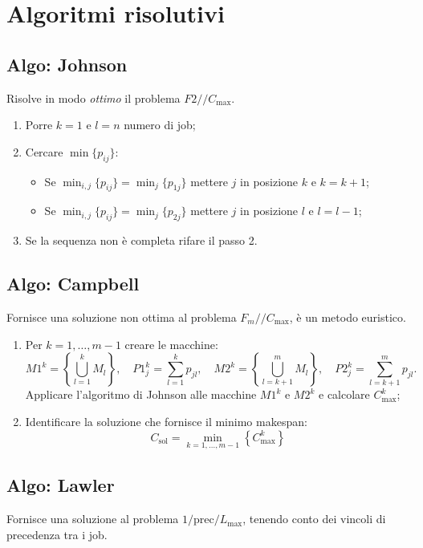 %
\section{Algoritmi risolutivi}
%
\subsection{Algo: Johnson}
Risolve in modo \emph{ottimo} il problema $ F2 / / C_{\max} $.
\begin{enumerate}[leftmargin=2.1cm, label=Passo \arabic*.]
    \item Porre $ k=1 $ e $ l=n $ numero di job;
    \item Cercare $ \min\{ p_{ij} \} $:
          \begin{itemize}
              \item Se $ \min_{i,j} \{ p_{ij} \} = \min_{j} \{ p_{1j} \}$ mettere $ j $ in posizione $ k $ e $ k=k+1 $;
              \item Se $ \min_{i,j} \{ p_{ij} \} = \min_{j} \{ p_{2j} \}$ mettere $ j $ in posizione $ l $ e $ l=l-1 $;
          \end{itemize}
    \item Se la sequenza non è completa rifare il passo 2.
\end{enumerate}

%
\subsection{Algo: Campbell}
Fornisce una soluzione non ottima al problema $ F_{m} / / C_{\max} $, è un metodo euristico.
\begin{enumerate}[leftmargin=2.1cm, label=Passo \arabic*.]
    \item Per $ k=1, \dots , m-1 $ creare le macchine:
          \[
              M1^{k}=\left\{\bigcup_{l=1}^{k}M_l\right\},\quad P1_{j}^{k}=\sum_{l=1}^{k}p_{jl},\quad M2^{k}=\left\{\bigcup_{l=k+1}^{m}M_l\right\},\quad P2_{j}^{k}=\sum_{l=k+1}^{m}p_{jl}.
          \]
          Applicare l'algoritmo di Johnson alle macchine $ M 1^{k} $ e $ M 2^{k} $ e calcolare $ C_{\max}^{k} $;
    \item Identificare la soluzione che fornisce il minimo makespan:
          \[
              C_{\text{sol}} = \min_{k=1, \dots, m-1} \left\{ C_{\max}^{k} \right\}
          \]
\end{enumerate}

%
\subsection{Algo: Lawler}
Fornisce una soluzione al problema $ 1 / \text{prec} / L_{\max} $, tenendo conto dei vincoli di precedenza tra i job.

